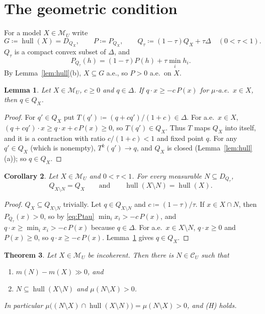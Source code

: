\documentclass[11pt]{article}
\newcommand{\M}{\mathcal{M}}
\newcommand{\CC}{\mathcal{C}}
\newcommand{\hull}{\operatorname{hull}}
\theoremstyle{plain}
\newtheorem{theorem}{Theorem}[section]
\newtheorem{lemma}[theorem]{Lemma}
\newtheorem{corollary}[theorem]{Corollary}
\theoremstyle{definition}
\theoremstyle{remark}
\begin{document}
\section{The geometric condition}\label{sec:H}

For a model $X\in\M_U$ write
\[
  G\coloneqq\hull(X)=D_{Q_X},\qquad P\coloneqq P_{Q_X},\qquad
  Q_\tau\coloneqq(1-\tau)Q_X+\tau\Delta\quad(0<\tau<1).
\]
$Q_\tau$ is a compact convex subset of $\Delta$, and
\begin{equation}\label{eq:Ptau}
  P_{Q_\tau}(h)=(1-\tau)P(h)+\tau\min_ih_i .
\end{equation}
By Lemma~\ref{lem:hull}(b), $X\subseteq G$ a.e., so $P>0$ a.e.\ on $X$.

\begin{lemma}\label{lem:contraction}
Let $X\in\M_U$, $c\ge0$ and $q\in\Delta$. If $q\cdot x\ge-c\,P(x)$ for $\mu$-a.e.\ $x\in
X$, then $q\in Q_X$.
\end{lemma}

\begin{proof}
For $q'\in Q_X$ put $T(q')\coloneqq(q+cq')/(1+c)\in\Delta$. For a.e.\ $x\in X$,
$(q+cq')\cdot x\ge q\cdot x+c\,P(x)\ge0$, so $T(q')\in Q_X$. Thus $T$ maps $Q_X$ into
itself, and it is a contraction with ratio $c/(1+c)<1$ and fixed point $q$. For any
$q'\in Q_X$ (which is nonempty), $T^k(q')\to q$, and $Q_X$ is closed
(Lemma~\ref{lem:hull}(a)); so $q\in Q_X$.
\end{proof}

\begin{corollary}\label{cor:shrink}
Let $X\in\M_U$ and $0<\tau<1$. For every measurable $N\subseteq D_{Q_\tau}$,
\[
  Q_{X\setminus N}=Q_X\qquad\text{and}\qquad\hull(X\setminus N)=\hull(X).
\]
\end{corollary}

\begin{proof}
$Q_X\subseteq Q_{X\setminus N}$ trivially. Let $q\in Q_{X\setminus N}$ and $c\coloneqq
(1-\tau)/\tau$. If $x\in X\cap N$, then $P_{Q_\tau}(x)>0$, so by \eqref{eq:Ptau}
$\min_ix_i>-c\,P(x)$, and $q\cdot x\ge\min_ix_i>-c\,P(x)$ because $q\in\Delta$. For
a.e.\ $x\in X\setminus N$, $q\cdot x\ge0$ and $P(x)\ge0$, so $q\cdot x\ge-c\,P(x)$.
Lemma~\ref{lem:contraction} gives $q\in Q_X$.
\end{proof}

\begin{theorem}\label{thm:H}
Let $X\in\M_U$ be incoherent. Then there is $N\in\CC_U$ such that
\begin{enumerate}[label=(\roman*)]
  \item $m(N)-m(X)\gg0$, and
  \item $N\subseteq\hull(X\setminus N)$ and $\mu(N\setminus X)>0$.
\end{enumerate}
In particular $\mu\bigl((N\setminus X)\cap\hull(X\setminus N)\bigr)=\mu(N\setminus X)
>0$, and (H) holds.
\end{theorem}
\end{document}
